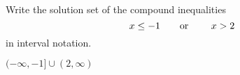 

Write the solution set of the compound inequalities
\[x\leq -1 \text{\quad\quad or \quad\quad} x>2 \]
in interval notation.

\begin{solution}
$(-\infty, -1]\cup (2, \infty)$
\end{solution}